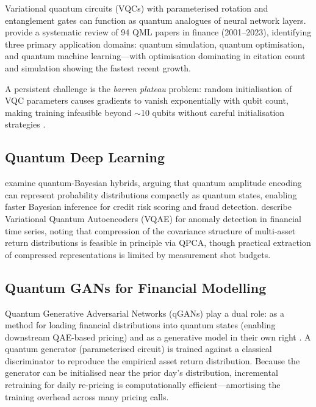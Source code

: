 \documentclass[12pt,a4paper]{article}
\begin{document}
Variational quantum circuits (VQCs) with parameterised rotation and entanglement gates can function as quantum analogues of neural network layers. \citet{bunescu_modern_2024} provide a systematic review of 94 QML papers in finance (2001--2023), identifying three primary application domains: quantum simulation, quantum optimisation, and quantum machine learning---with optimisation dominating in citation count and simulation showing the fastest recent growth.

A persistent challenge is the \emph{barren plateau} problem: random initialisation of VQC parameters causes gradients to vanish exponentially with qubit count, making training infeasible beyond $\sim$10 qubits without careful initialisation strategies \citep{herman_quantum_2023}.

\subsection{Quantum Deep Learning}

\citet{samal_quantum_2024} examine quantum-Bayesian hybrids, arguing that quantum amplitude encoding can represent probability distributions compactly as quantum states, enabling faster Bayesian inference for credit risk scoring and fraud detection. \citet{gong_quantum_2026-1} describe Variational Quantum Autoencoders (VQAE) for anomaly detection in financial time series, noting that compression of the covariance structure of multi-asset return distributions is feasible in principle via QPCA, though practical extraction of compressed representations is limited by measurement shot budgets.

\subsection{Quantum GANs for Financial Modelling}

Quantum Generative Adversarial Networks (qGANs) play a dual role: as a method for loading financial distributions into quantum states (enabling downstream QAE-based pricing) and as a generative model in their own right \citep{stamatopoulos_option_2020}. A quantum generator (parameterised circuit) is trained against a classical discriminator to reproduce the empirical asset return distribution. Because the generator can be initialised near the prior day's distribution, incremental retraining for daily re-pricing is computationally efficient---amortising the training overhead across many pricing calls.

\end{document}

